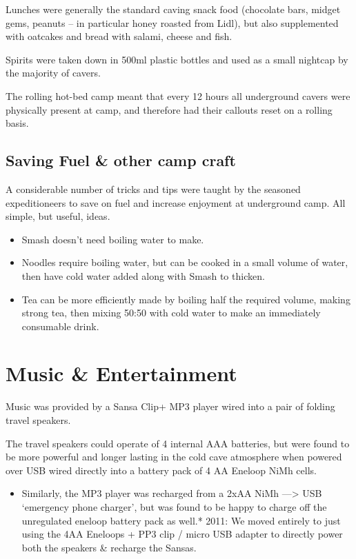 Lunches were generally the standard caving snack food (chocolate bars,
midget gems, peanuts -- in particular honey roasted from Lidl), but also
supplemented with oatcakes and bread with salami, cheese and fish.

Spirits were taken down in 500ml plastic bottles and used as a small
nightcap by the majority of cavers.

The rolling hot-bed camp meant that every 12 hours all underground
cavers were physically present at camp, and therefore had their callouts
reset on a rolling basis.


\subsection{Saving Fuel \& other camp
craft}

A considerable number of tricks and tips were taught by the seasoned
expeditioneers to save on fuel and increase enjoyment at underground
camp. All simple, but useful, ideas.

\begin{itemize}
\item
  Smash doesn't need boiling water to make.
\item
  Noodles require boiling water, but can be cooked in a small volume of
  water, then have cold water added along with Smash to thicken.
\item
  Tea can be more efficiently made by boiling half the required volume,
  making strong tea, then mixing 50:50 with cold water to make an
  immediately consumable drink.
\end{itemize}


\section{Music \& Entertainment}

Music was provided by a Sansa Clip+ MP3 player wired into a pair of
folding travel speakers.

The travel speakers could operate of 4 internal AAA batteries, but were
found to be more powerful and longer lasting in the cold cave atmosphere
when powered over USB wired directly into a battery pack of 4 AA Eneloop
NiMh cells.

\begin{itemize}
\item
  Similarly, the MP3 player was recharged from a 2xAA NiMh
  ---\textgreater{} USB `emergency phone charger', but was found to be
  happy to charge off the unregulated eneloop battery pack as well.*
  2011: We moved entirely to just using the 4AA Eneloops + PP3 clip /
  micro USB adapter to directly power both the speakers \& recharge the
  Sansas.
\end{itemize}

